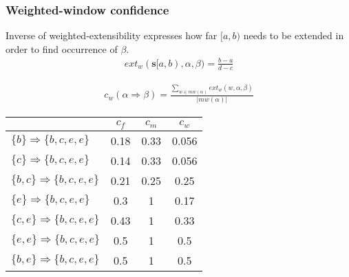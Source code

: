\documentclass[dvipsnames]{beamer}
\newcommand{\sequencetickmarks}[3]
{
    \pgfmathsetmacro\secondtickmark{#2+0.5}
    \pgfmathsetmacro\lasttickmark{#2+0.5*#1}

    \draw (#2,#3) -- (\lasttickmark,#3);

    \foreach \x in {#2,\secondtickmark,...,\lasttickmark}
        \draw (\x,#3) -- +(0,3pt);
}
\newcommand{\sequenceeventtypes}[4]
{
    \pgfmathsetlengthmacro\nodeheight{(#2)+(.8em)}

    \foreach \t/\eventtype [evaluate=\t as \x using (\t-#3)*0.5+(#1)] in {#4}
    {
        \node [font=\vphantom{$ fbd $}] at (\x,#2) {$ \eventtype $};
        \node (t\t) [inner sep=0] at (\x,\nodeheight) {};
    }
}
\newcommand{\examplesequence}
{
    \sequencetickmarks{23}{-5.5}{0}

    \sequenceeventtypes{-5.5}{1em}{30}{32/c,33/f,34/b,35/b,38/c,40/d,41/a,44/b,46/e,47/a,48/e,49/c};
}
\begin{document}
\begin{frame}
\frametitle{Weighted-window confidence}

Inverse of weighted-extensibility expresses how far $ [a, b) $ needs to be extended in order to find occurrence of $ \beta $.
\begin{align*}
ext_w(\boldsymbol{s}[a, b), \alpha, \beta) = \frac{b - a}{d - c}
\end{align*}

\begin{align*}
c_w(\alpha \Rightarrow \beta) = \frac{\sum_{w \in mw(\alpha)} ext_w(w, \alpha, \beta)}{| mw(\alpha) |}
\end{align*}

\end{frame}
\begin{frame}
\begin{center}
\end{center}
\begin{center}
\begin{tabulary}{\textwidth}{L|S|S|S}
& $ c_f $ & $ c_m $ & $ c_w $ \\
\hline
$ \{ b \}    \Rightarrow \{ b, c, e, e \} $ & 0.18 & 0.33 & 0.056 \\
$ \{ c \}    \Rightarrow \{ b, c, e, e \} $ & 0.14 & 0.33 & 0.056 \\
$ \{ b, c \} \Rightarrow \{ b, c, e, e \} $ & 0.21 & 0.25 & 0.25 \\
$ \{ e \}    \Rightarrow \{ b, c, e, e \} $ & 0.3  & 1    & 0.17 \\
$ \{ c, e \} \Rightarrow \{ b, c, e, e \} $ & 0.43 & 1    & 0.33 \\
$ \{ e, e \} \Rightarrow \{ b, c, e, e \} $ & 0.5  & 1    & 0.5 \\
$ \{ b, e \} \Rightarrow \{ b, c, e, e \} $ & 0.5  & 1    & 0.5 \\
\end{tabulary}
\end{center}
\end{frame}
\end{document}
